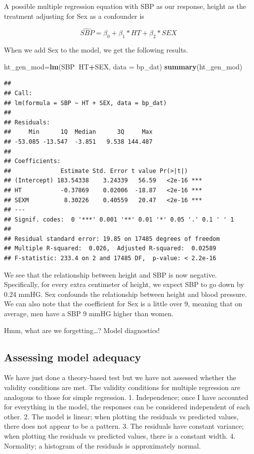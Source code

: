 \documentclass[]{book}
\newenvironment{Shaded}{\begin{snugshade}}{\end{snugshade}}
\newcommand{\DataTypeTok}[1]{\textcolor[rgb]{0.13,0.29,0.53}{#1}}
\newcommand{\KeywordTok}[1]{\textcolor[rgb]{0.13,0.29,0.53}{\textbf{#1}}}
\newcommand{\NormalTok}[1]{#1}
\newcommand{\OperatorTok}[1]{\textcolor[rgb]{0.81,0.36,0.00}{\textbf{#1}}}
\begin{document}
A possible multiple regression equation with SBP as our response, height as the treatment adjusting for Sex as a confounder is

\[\widehat{SBP}=\beta_0+\beta_1*HT+\beta_2*SEX\]

When we add Sex to the model, we get the following results.

\begin{Shaded}
\begin{Highlighting}[]
\NormalTok{ht_gen_mod=}\KeywordTok{lm}\NormalTok{(SBP}\OperatorTok{~}\NormalTok{HT}\OperatorTok{+}\NormalTok{SEX,}
         \DataTypeTok{data =}\NormalTok{ bp_dat)}
\KeywordTok{summary}\NormalTok{(ht_gen_mod)}
\end{Highlighting}
\end{Shaded}

\begin{verbatim}
## 
## Call:
## lm(formula = SBP ~ HT + SEX, data = bp_dat)
## 
## Residuals:
##     Min      1Q  Median      3Q     Max 
## -53.085 -13.547  -3.851   9.538 144.487 
## 
## Coefficients:
##              Estimate Std. Error t value Pr(>|t|)    
## (Intercept) 183.54338    3.24339   56.59   <2e-16 ***
## HT           -0.37869    0.02006  -18.87   <2e-16 ***
## SEXM          8.30226    0.40559   20.47   <2e-16 ***
## ---
## Signif. codes:  0 '***' 0.001 '**' 0.01 '*' 0.05 '.' 0.1 ' ' 1
## 
## Residual standard error: 19.85 on 17485 degrees of freedom
## Multiple R-squared:  0.026,  Adjusted R-squared:  0.02589 
## F-statistic: 233.4 on 2 and 17485 DF,  p-value: < 2.2e-16
\end{verbatim}

We see that the relationship between height and SBP is now negative. Specifically, for every extra centimeter of height, we expect SBP to go down by 0.24 mmHG. Sex confounds the relationship between height and blood pressure. We can also note that the coefficient for Sex is a little over 9, meaning that on average, men have a SBP 9 mmHG higher than women.

Hmm, what are we forgetting\ldots{}? Model diagnostics!

\hypertarget{assessing-model-adequacy}{%
\subsection{Assessing model adequacy}\label{assessing-model-adequacy}}

We have just done a theory-based test but we have not assessed whether the validity conditions are met. The validity conditions for multiple regression are analogous to those for simple regression.
1. Independence; once I have accounted for everything in the model, the responses can be considered independent of each other.
2. The model is linear; when plotting the residuals vs predicted values, there does not appear to be a pattern.
3. The residuals have constant variance; when plotting the residuals vs predicted values, there is a constant width.
4. Normality; a histogram of the residuals is approximately normal.
\end{document}
